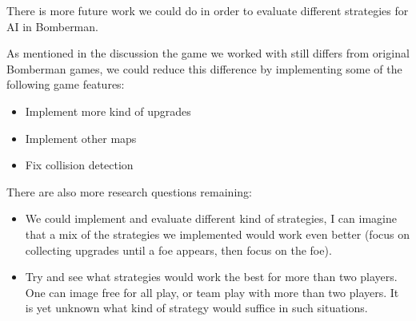 %
There is more future work we could do in order to evaluate different
strategies for AI in Bomberman.

As mentioned in the discussion the game we worked with still differs
from original Bomberman games, we could reduce this difference by
implementing some of the following game features:
\begin{itemize}
\item Implement more kind of upgrades
\item Implement other maps
\item Fix collision detection
\end{itemize}

There are also more research questions remaining:
\begin{itemize}
\item We could implement and evaluate different kind of strategies, I can
imagine that a mix of the strategies we implemented would work even better
(focus on collecting upgrades until a foe appears, then focus on the foe).
\item Try and see what strategies would work the best for more than two
players. One can image free for all play, or team play with more than
two players. It is yet unknown what kind of strategy would suffice in such
situations.
\end{itemize}

